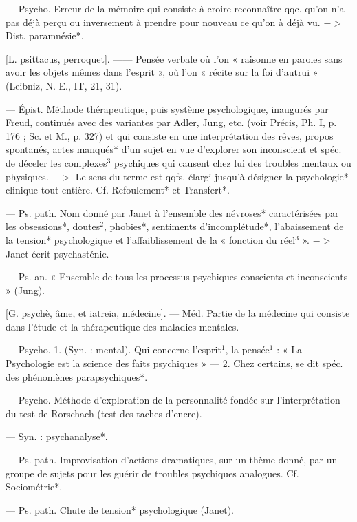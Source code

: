 \begin{itemize}[leftmargin=1cm, label=, itemsep=1pt]
 — Psycho. Erreur de
la mémoire qui consiste à croire
reconnaître qqc. qu’on n'a pas déjà
perçu ou inversement à prendre
pour nouveau ce qu’on à déjà vu.
$->$ Dist. paramnésie*.

 [L. psittacus, perroquet].
—— Pensée verbale où l’on « raisonne
en paroles sans avoir les objets
mêmes dans l’esprit », où l’on « récite
sur la foi d'autrui » (Leibniz, N. E.,
IT, 21, 31).

 — Épist. Méthode thérapeutique, puis système psychologique, inaugurés par Freud, continués avec des variantes par Adler,
Jung, etc. (voir Précis, Ph. I, p. 176 ;
Sc. et M., p. 327) et qui consiste
en une interprétation des rêves,
propos spontanés, actes manqués*
d’un sujet en vue d’explorer son
inconscient et spéc. de déceler les
complexes$^3$ psychiques qui causent
chez lui des troubles mentaux ou
physiques. $->$ Le sens du terme
est qqfs. élargi jusqu’à désigner la
psychologie* clinique tout entière.
Cf. Refoulement* et Transfert*.

 — Ps. path. Nom
donné par Janet à l’ensemble des
névroses* caractérisées par les obsessions*, doutes$^2$, phobies*, sentiments
d’incomplétude*, l’abaissement de
la tension* psychologique et l’affaiblissement de la « fonction du réel$^3$ ».
$->$ Janet écrit psychasténie.

 — Ps. an. « Ensemble de tous
les processus psychiques conscients
et inconscients » (Jung).

 [G. psychè, âme, et iatreia,
médecine]. — Méd. Partie de la
médecine qui consiste dans l'étude
et la thérapeutique des maladies
mentales.

 — Psycho. 1. (Syn. : mental). Qui concerne l'esprit$^1$, la
pensée$^1$ : « La Psychologie est la
science des faits psychiques » —
2. Chez certains, se dit spéc. des
phénomènes parapsychiques*.

 — Psycho. Méthode
d'exploration de la personnalité
fondée sur l'interprétation du test de
Rorschach (test des taches d’encre).

 — Syn. : psychanalyse*.

 — Ps. path. Improvisation d'actions dramatiques, sur
un thème donné, par un groupe de
sujets pour les guérir de troubles
psychiques analogues. Cf. Soeiométrie*.

 — Ps. path. Chute de
tension* psychologique (Janet).


\end{itemize}
